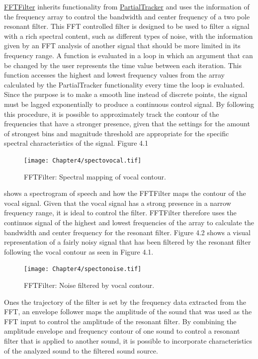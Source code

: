 \href{http://github.com/freuben/FedeLib/blob/master/PartialTracking/PartialTracker.sc}{FFTFilter} inherits functionality from \hyperlink{partrack}{PartialTracker} and uses the information of the frequency array to control the bandwidth and center frequency of a two pole resonant filter. This FFT controlled filter is designed to be used to filter a signal with a rich spectral content, such as different types of noise, with the information given by an FFT analysis of another signal that should be more limited in its frequency range. A function is evaluated in a loop in which an argument that can be changed by the user represents the time value between each iteration. This function accesses the highest and lowest frequency values from the array calculated by the PartialTracker functionality every time the loop is evaluated. Since the purpose is to make a smooth line instead of discrete points, the signal must be lagged exponentially to produce a continuous control signal. By following this procedure, it is possible to approximately track the contour of the frequencies that have a stronger presence, given that the settings for the amount of strongest bins and magnitude threshold are appropriate for the specific spectral characteristics of the signal. Figure 4.1 
\begin{figure}[htbp] %
   \centering
   \texttt{[image: Chapter4/spectovocal.tif]} %
   \caption{FFTFilter: Spectral mapping of vocal contour.}
   \label{fig:example}
\end{figure}
shows a spectrogram of speech and how the FFTFilter maps the contour of the vocal signal. Given that the vocal signal has a strong presence in a narrow frequency range, it is ideal to control the filter. FFTFilter therefore uses the continuos signal of the highest and lowest frequencies of the array to calculate the bandwidth and center frequency for the resonant filter. Figure 4.2 shows a visual representation of a fairly noisy signal that has been filtered by the resonant filter following the vocal contour as seen in Figure 4.1. 
\begin{figure}[htbp] %
   \centering
   \texttt{[image: Chapter4/spectonoise.tif]} %
   \caption{FFTFilter: Noise filtered by vocal contour.}
   \label{fig:example}
\end{figure}
Ones the trajectory of the filter is set by the frequency data extracted from the FFT, an envelope follower maps the amplitude of the sound that was used as the FFT input to control the amplitude of the resonant filter. By combining the amplitude envelope and frequency contour of one sound to control a resonant filter that is applied to another sound, it is possible to incorporate characteristics of the analyzed sound to the filtered sound source.

